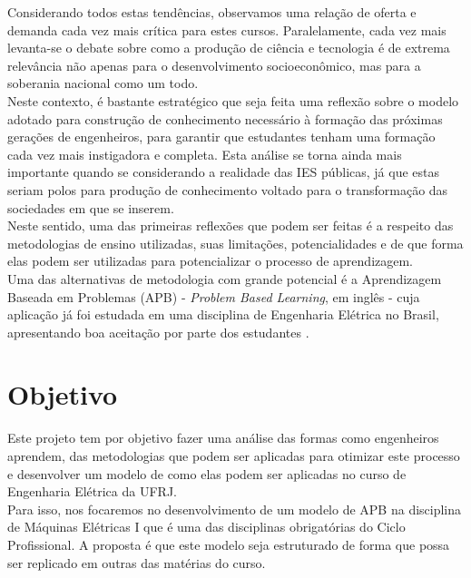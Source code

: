 		Considerando todos estas tendências, observamos uma relação de oferta e demanda cada vez mais crítica para estes cursos. Paralelamente, cada vez mais levanta-se o debate sobre como a produção de ciência e tecnologia é de extrema relevância não apenas para o desenvolvimento socioeconômico, mas para a soberania nacional como um todo.\\
		
		Neste contexto, é bastante estratégico que seja feita uma reflexão sobre o modelo adotado para construção de conhecimento necessário à formação das próximas gerações de engenheiros, para garantir que estudantes tenham uma formação cada vez mais instigadora e completa. Esta análise se torna ainda mais importante quando se considerando a realidade das IES públicas, já que estas seriam polos para produção de conhecimento voltado para o transformação das sociedades em que se inserem.\\
		
		Neste sentido, uma das primeiras reflexões que podem ser feitas é a respeito das metodologias de ensino utilizadas, suas limitações, potencialidades e de que forma elas podem ser utilizadas para potencializar o processo de aprendizagem.\\
		
		Uma das alternativas de metodologia com grande potencial é a Aprendizagem Baseada em Problemas (APB) - \textit{Problem Based Learning}, em inglês - cuja aplicação já foi estudada em uma disciplina de Engenharia Elétrica no Brasil, apresentando boa aceitação por parte dos estudantes \cite{students_evaluate_pbl}.
		
	
	\section{Objetivo}

		Este projeto tem por objetivo fazer uma análise das formas como engenheiros aprendem, das metodologias que podem ser aplicadas para otimizar este processo e desenvolver um modelo de como elas podem ser aplicadas no curso de Engenharia Elétrica da UFRJ.\\
		
		Para isso, nos focaremos no desenvolvimento de um modelo de APB na disciplina de Máquinas Elétricas I que é uma das disciplinas obrigatórias do Ciclo Profissional. A proposta é que este modelo seja estruturado de forma que possa ser replicado em outras das matérias do curso.
	
